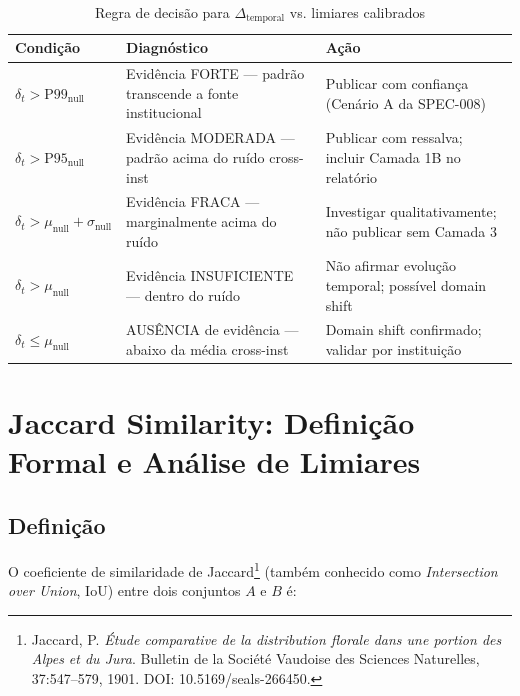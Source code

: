 \documentclass[12pt,a4paper]{article}
\theoremstyle{remark}
\begin{document}
\begin{table}[H]\centering\footnotesize
\caption{Regra de decisão para $\Delta_{\text{temporal}}$ vs. limiares calibrados}
\label{tab:regra_decisao}
\begin{tabular}{p{}p{}p{}}
\toprule
\textbf{Condição} & \textbf{Diagnóstico} & \textbf{Ação} \\
\midrule
$\delta_t > \text{P99}_{\text{null}}$ & Evidência FORTE — padrão transcende a fonte institucional & Publicar com confiança (Cenário A da SPEC-008) \\
$\delta_t > \text{P95}_{\text{null}}$ & Evidência MODERADA — padrão acima do ruído cross-inst & Publicar com ressalva; incluir Camada 1B no relatório \\
$\delta_t > \mu_{\text{null}} + \sigma_{\text{null}}$ & Evidência FRACA — marginalmente acima do ruído & Investigar qualitativamente; não publicar sem Camada 3 \\
$\delta_t > \mu_{\text{null}}$ & Evidência INSUFICIENTE — dentro do ruído & Não afirmar evolução temporal; possível domain shift \\
$\delta_t \leq \mu_{\text{null}}$ & AUSÊNCIA de evidência — abaixo da média cross-inst & Domain shift confirmado; validar por instituição \\
\bottomrule
\end{tabular}
\end{table}

\newpage

\section{Jaccard Similarity: Definição Formal e Análise de Limiares}

\subsection{Definição}

O coeficiente de similaridade de Jaccard\footnote{Jaccard, P. \textit{Étude comparative de la distribution florale dans une portion des Alpes et du Jura}. Bulletin de la Société Vaudoise des Sciences Naturelles, 37:547--579, 1901. DOI: 10.5169/seals-266450.} (também conhecido como \textit{Intersection over Union}, IoU) entre dois conjuntos $A$ e $B$ é:
\end{document}
